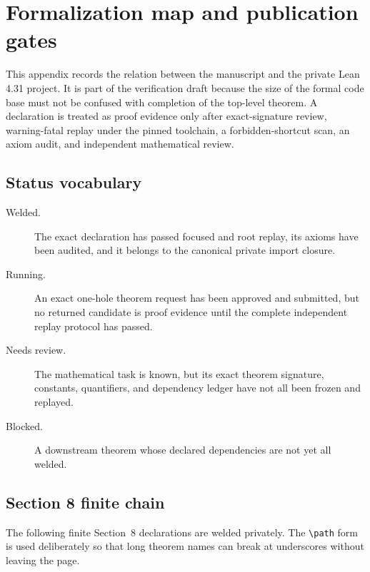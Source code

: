 \appendix

\section{Formalization map and publication gates}
\label{app:formalization-status-v3}

This appendix records the relation between the manuscript and the private Lean
4.31 project. It is part of the verification draft because the size of the
formal code base must not be confused with completion of the top-level theorem.
A declaration is treated as proof evidence only after exact-signature review,
warning-fatal replay under the pinned toolchain, a forbidden-shortcut scan, an
axiom audit, and independent mathematical review.

\subsection{Status vocabulary}

\begin{description}
\item[Welded.] The exact declaration has passed focused and root replay, its
axioms have been audited, and it belongs to the canonical private import
closure.
\item[Running.] An exact one-hole theorem request has been approved and
submitted, but no returned candidate is proof evidence until the complete
independent replay protocol has passed.
\item[Needs review.] The mathematical task is known, but its exact theorem
signature, constants, quantifiers, and dependency ledger have not all been
frozen and replayed.
\item[Blocked.] A downstream theorem whose declared dependencies are not yet
all welded.
\end{description}

\subsection{Section 8 finite chain}

The following finite Section~8 declarations are welded privately. The
\verb|\path| form is used deliberately so that long theorem names can break at
underscores without leaving the page.

